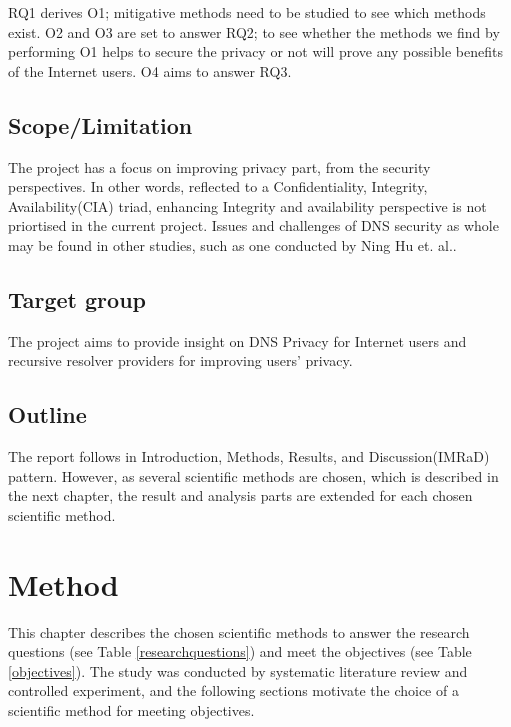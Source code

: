 \documentclass[a4paper,12pt]{article}
\begin{document}
RQ1 derives O1; mitigative methods need to be studied to see which methods exist.
O2 and O3 are set to answer RQ2; to see whether the methods we find by performing O1 helps to secure the privacy or not will prove any possible benefits of the Internet users. O4 aims to answer RQ3.
\subsection{Scope/Limitation}
The project has a focus on improving privacy part, from the security perspectives. In other words, reflected to a Confidentiality, Integrity, Availability(CIA) triad, enhancing Integrity and availability perspective is not priortised in the current project. Issues and challenges of DNS security as whole may be found in other studies, such as one conducted by Ning Hu et. al.\cite{ning2017dnssecurity}. 


\subsection{Target group}
The project aims to provide insight on DNS Privacy for Internet users and recursive resolver providers for improving users' privacy.

\subsection{Outline}
The report follows in Introduction, Methods, Results, and Discussion(IMRaD) pattern. However, as several scientific methods are chosen, which is described in the next chapter, the result and analysis parts are extended for each chosen scientific method. 

\newpage
\section{Method}
\label{Method}
This chapter describes the chosen scientific methods to answer the research questions (see Table \ref{researchquestions}) and meet the objectives (see Table \ref{objectives}).
The study was conducted by systematic literature review and controlled experiment, and the following sections motivate the choice of a scientific method for meeting objectives. 
\end{document}
